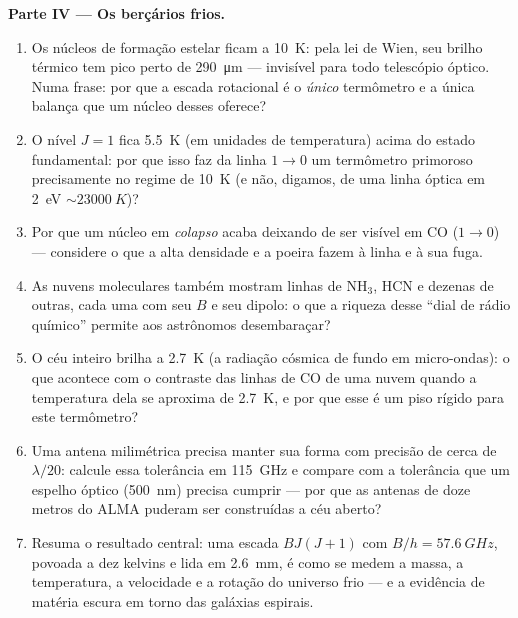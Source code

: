 \begin{problem}
\medskip\noindent\textbf{Parte IV --- Os berçários frios.}
\begin{enumerate}[resume]
  \item Os núcleos de formação estelar ficam a \qty{10}{K}: pela lei
        de Wien, seu brilho térmico tem pico perto de
        \qty{290}{\micro m} --- invisível para todo telescópio óptico.
        Numa frase: por que a escada rotacional é o \emph{único}
        termômetro e a única balança que um núcleo desses oferece?
  \item O nível $J = 1$ fica \qty{5.5}{K} (em unidades de
        temperatura) acima do estado fundamental: por que isso faz da
        linha $1\to0$ um termômetro primoroso precisamente no regime
        de \qty{10}{K} (e não, digamos, de uma linha óptica em
        \qty{2}{eV} $\sim \qty{23000}{K}$)?
  \item Por que um núcleo em \emph{colapso} acaba deixando de ser
        visível em CO ($1\to0$) --- considere o que a alta densidade e
        a poeira fazem à linha e à sua fuga.
  \item As nuvens moleculares também mostram linhas de NH$_3$, HCN e
        dezenas de outras, cada uma com seu $B$ e seu dipolo: o que a
        riqueza desse ``dial de rádio químico'' permite aos astrônomos
        desembaraçar?
  \item O céu inteiro brilha a \qty{2.7}{K} (a radiação cósmica de
        fundo em micro-ondas): o que acontece com o contraste das
        linhas de CO de uma nuvem quando a temperatura dela se aproxima
        de \qty{2.7}{K}, e por que esse é um piso rígido para este
        termômetro?
  \item Uma antena milimétrica precisa manter sua forma com precisão
        de cerca de $\lambda/20$: calcule essa tolerância em
        \qty{115}{GHz} e compare com a tolerância que um espelho óptico
        (\qty{500}{nm}) precisa cumprir --- por que as antenas de doze
        metros do ALMA puderam ser construídas a céu aberto?
  \item Resuma o resultado central: uma escada $BJ(J+1)$ com $B/h =
        \qty{57.6}{GHz}$, povoada a dez kelvins e lida em
        \qty{2.6}{mm}, é como se medem a massa, a temperatura, a
        velocidade e a rotação do universo frio --- e a evidência de
        matéria escura em torno das galáxias espirais.
\end{enumerate}
\end{problem}
